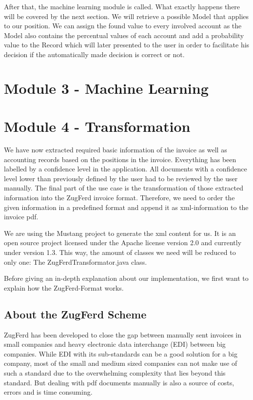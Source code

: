 After that, the machine learning module is called. What exactly happens there will be covered by the next section. We will retrieve a possible Model that applies to our position. We can assign the found value to every involved account as the Model also contains the percentual values of each account and add a probability value to the Record which will later presented to the user in order to facilitate his decision if the automatically made decision is correct or not.


\section{Module 3 - Machine Learning}

\section{Module 4 - Transformation}

We have now extracted required basic information of the invoice as well as accounting records based on the positions in the invoice. Everything has been labelled by a confidence level in the application. All documents with a confidence level lower than previously defined by the user had to be reviewed by the user manually.
The final part of the use case is the transformation of those extracted information into the ZugFerd invoice format. Therefore, we need to order the given information in a predefined format and append it as xml-information to the invoice pdf.

We are using the Mustang project to generate the xml content for us. It is an open source project licensed under the Apache license version 2.0 and currently under version 1.3. This way, the amount of classes we need will be reduced to only one: The ZugFerdTransformator.java class.

Before giving an in-depth explanation about our implementation, we first want to explain how the ZugFerd-Format works.

\subsection{About the ZugFerd Scheme}

ZugFerd has been developed to close the gap between manually sent invoices in small companies and heavy electronic data interchange (EDI) between big companies. While EDI with its sub-standards can be a good solution for a big company, most of the small and medium sized companies can not make use of such a standard due to the overwhelming complexity that lies beyond this standard. But dealing with pdf documents manually is also a source of costs, errors and is time consuming.

